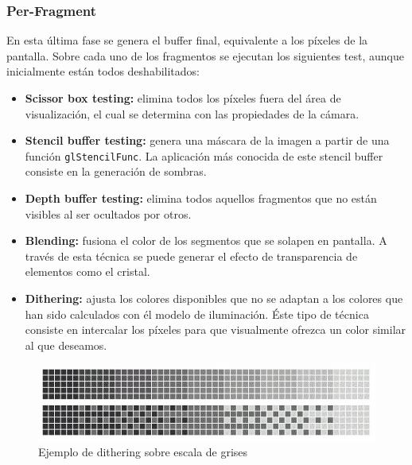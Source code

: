 \subsubsection{Per-Fragment}

En esta última fase se genera el buffer final, equivalente a los píxeles de la pantalla. Sobre cada uno de los fragmentos se ejecutan los siguientes test, aunque inicialmente están todos deshabilitados:
\begin{itemize}
\item \textbf{Scissor box testing:} elimina todos los píxeles fuera del área de visualización, el cual se determina con las propiedades de la cámara.
\item \textbf{Stencil buffer testing:} genera una máscara de la imagen a partir de una función \texttt{glStencilFunc}. La aplicación más conocida de este stencil buffer consiste en la generación de sombras.
\item \textbf{Depth buffer testing:} elimina todos aquellos fragmentos que no están visibles al ser ocultados por otros.
\item \textbf{Blending:} fusiona el color de los segmentos que se solapen en pantalla. A través de esta técnica se puede generar el efecto de transparencia de elementos como el cristal.
\item \textbf{Dithering:} ajusta los colores disponibles que no se adaptan a los colores que han sido calculados con él modelo de iluminación. Éste tipo de técnica consiste en intercalar los píxeles para que visualmente ofrezca un color similar al que deseamos.
\end{itemize}


\begin{figure}[H]
\centering
\includegraphics[width=11.5cm]{img/dithering.jpg}
\caption{Ejemplo de dithering sobre escala de grises}
\end{figure}
